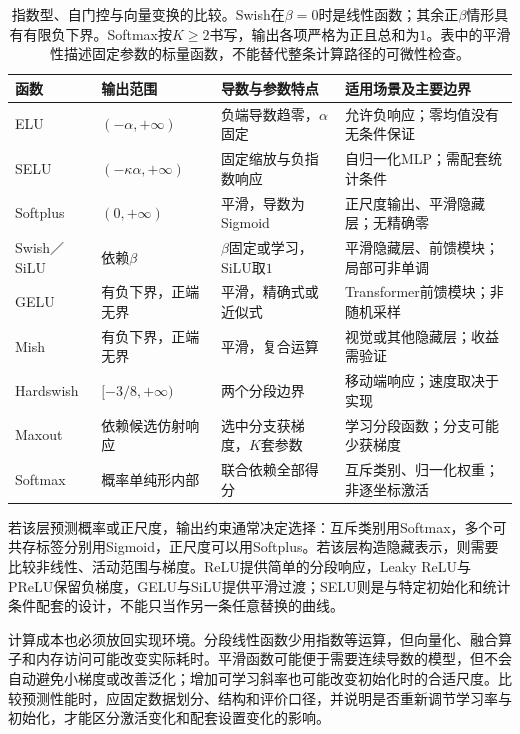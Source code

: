 \begin{table}[htb]
  \centering
  \small
  \begin{tabularx}{\linewidth}{@{}l l X X@{}}
    \toprule
    函数 & 输出范围 & 导数与参数特点 & 适用场景及主要边界 \\
    \midrule
    ELU & $(-\alpha,+\infty)$ & 负端导数趋零，$\alpha$固定 & 允许负响应；零均值没有无条件保证 \\
    SELU & $(-\kappa\alpha,+\infty)$ & 固定缩放与负指数响应 & 自归一化MLP；需配套统计条件 \\
    Softplus & $(0,+\infty)$ & 平滑，导数为Sigmoid & 正尺度输出、平滑隐藏层；无精确零 \\
    Swish／SiLU & 依赖$\beta$ & $\beta$固定或学习，SiLU取$1$ & 平滑隐藏层、前馈模块；局部可非单调 \\
    GELU & 有负下界，正端无界 & 平滑，精确式或近似式 & Transformer前馈模块；非随机采样 \\
    Mish & 有负下界，正端无界 & 平滑，复合运算 & 视觉或其他隐藏层；收益需验证 \\
    Hardswish & $[-3/8,+\infty)$ & 两个分段边界 & 移动端响应；速度取决于实现 \\
    Maxout & 依赖候选仿射响应 & 选中分支获梯度，$K$套参数 & 学习分段函数；分支可能少获梯度 \\
    Softmax & 概率单纯形内部 & 联合依赖全部得分 & 互斥类别、归一化权重；非逐坐标激活 \\
    \bottomrule
  \end{tabularx}
  \caption{指数型、自门控与向量变换的比较。Swish在$\beta=0$时是线性函数；其余正$\beta$情形具有有限负下界。Softmax按$K\geq2$书写，输出各项严格为正且总和为$1$。表中的平滑性描述固定参数的标量函数，不能替代整条计算路径的可微性检查。}
  \label{tab:ffn-activation-smooth}
\end{table}

若该层预测概率或正尺度，输出约束通常决定选择：互斥类别用Softmax，多个可共存标签分别用Sigmoid，正尺度可以用Softplus。若该层构造隐藏表示，则需要比较非线性、活动范围与梯度。ReLU提供简单的分段响应，Leaky ReLU与PReLU保留负梯度，GELU与SiLU提供平滑过渡；SELU则是与特定初始化和统计条件配套的设计，不能只当作另一条任意替换的曲线。

计算成本也必须放回实现环境。分段线性函数少用指数等运算，但向量化、融合算子和内存访问可能改变实际耗时。平滑函数可能便于需要连续导数的模型，但不会自动避免小梯度或改善泛化；增加可学习斜率也可能改变初始化时的合适尺度。比较预测性能时，应固定数据划分、结构和评价口径，并说明是否重新调节学习率与初始化，才能区分激活变化和配套设置变化的影响。

